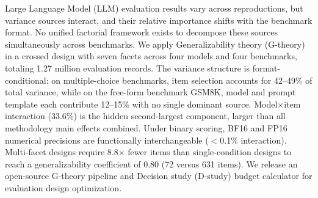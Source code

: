 Large Language Model (LLM) evaluation results vary across reproductions, but variance sources interact, and their relative importance shifts with the benchmark format. No unified factorial framework exists to decompose these sources simultaneously across benchmarks. We apply Generalizability theory (G-theory) in a crossed design with seven facets across four models and four benchmarks, totaling 1.27 million evaluation records. The variance structure is format-conditional: on multiple-choice benchmarks, item selection accounts for 42--49\% of total variance, while on the free-form benchmark GSM8K, model and prompt template each contribute 12--15\% with no single dominant source. Model$\times$item interaction (33.6\%) is the hidden second-largest component, larger than all methodology main effects combined. Under binary scoring, BF16 and FP16 numerical precisions are functionally interchangeable ($<$0.1\% interaction). Multi-facet designs require 8.8$\times$ fewer items than single-condition designs to reach a generalizability coefficient of 0.80 (72 versus 631 items). We release an open-source G-theory pipeline and Decision study (D-study) budget calculator for evaluation design optimization.

